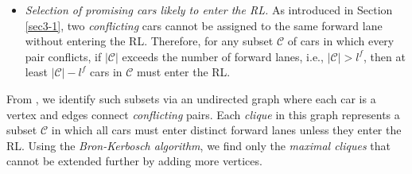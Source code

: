 \documentclass[12pt]{article}
\begin{document}
\begin{itemize}
    \item \textit{Selection of promising cars likely to enter the RL.} As introduced in Section \ref{sec3-1}, two \textit{conflicting} cars cannot be assigned to the same forward lane without entering the RL. Therefore, for any subset $\mathcal{C}$ of cars in which every pair conflicts, if $|\mathcal{C}|$ exceeds the number of forward lanes, i.e., $|\mathcal{C}|>l^f$, then at least $|\mathcal{C}|-l^f$ cars in $\mathcal{C}$ must enter the RL.
\end{itemize}

From \citet{guo2025logic}, we identify such subsets via an undirected graph where each car is a vertex and edges connect \textit{conflicting} pairs. Each \textit{clique} in this graph represents a subset $\mathcal{C}$ in which all cars must enter distinct forward lanes unless they enter the RL. Using the \textit{Bron-Kerbosch algorithm}, we find only the \textit{maximal cliques} that cannot be extended further by adding more vertices.

\end{document}
